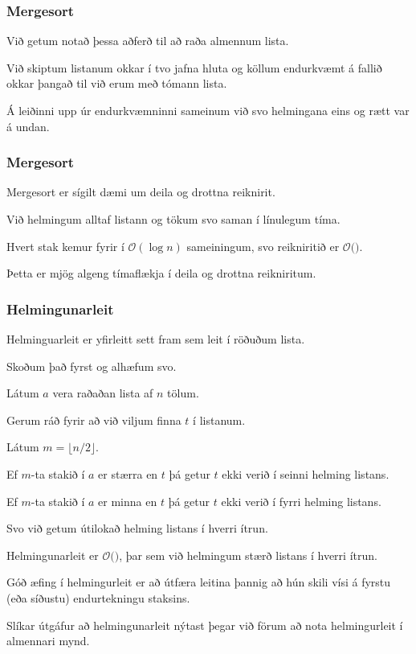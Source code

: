 {
	\frametitle{Mergesort}
	{
		\item<1-> Við getum notað þessa aðferð til að raða almennum lista.
		\item<2-> Við skiptum listanum okkar í tvo jafna hluta og köllum endurkvæmt á fallið okkar þangað til við erum með tómann lista.
		\item<3-> Á leiðinni upp úr endurkvæmninni sameinum við svo helmingana eins og rætt var á undan.
	}
}

{
}

{
	\frametitle{Mergesort}
	{
		\item<1-> Mergesort er sígilt dæmi um deila og drottna reiknirit.
		\item<2-> Við helmingum alltaf listann og tökum svo saman í línulegum tíma.
		\item<3-> Hvert stak kemur fyrir í $\mathcal{O}(\log n)$ sameiningum, svo reikniritið er $\mathcal{O}($\onslide<4->{$n \log n$}$)$.
		\item<5-> Þetta er mjög algeng tímaflækja í deila og drottna reikniritum.
	}
}

{
	\frametitle{Helmingunarleit}
	{
		\item<1-> Helminguarleit er yfirleitt sett fram sem leit í röðuðum lista.
		\item<2-> Skoðum það fyrst og alhæfum svo.
		\item<3-> Látum $a$ vera raðaðan lista af $n$ tölum.
		\item<4-> Gerum ráð fyrir að við viljum finna $t$ í listanum.
		\item<5-> Látum $m = \lfloor n/2 \rfloor$.
		\item<6-> Ef $m$-ta stakið í $a$ er stærra en $t$ þá getur $t$ ekki verið í seinni helming listans.
		\item<7-> Ef $m$-ta stakið í $a$ er minna en $t$ þá getur $t$ ekki verið í fyrri helming listans.
		\item<8-> Svo við getum útilokað helming listans í hverri ítrun.
	}
}

{
}

{
	{
		\item<1-> Helmingunarleit er $\mathcal{O}($$)$, þar sem við helmingum stærð listans í hverri ítrun.
		\item<3-> Góð æfing í helmingurleit er að útfæra leitina þannig að hún skili vísi á fyrstu (eða síðustu)  endurtekningu staksins.
		\item<4-> Slíkar útgáfur að helmingunarleit nýtast þegar við förum að nota helmingurleit í almennari mynd.
	}
}

